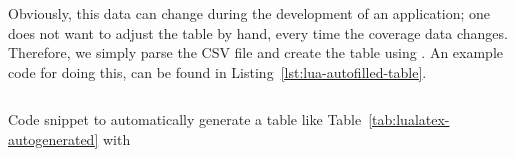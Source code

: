 Obviously, this data can change during the development of an application; one
does not want to adjust the table by hand, every time the coverage data changes.
Therefore, we simply parse the CSV file and create the table using
.  An example code for doing this, can be found in
Listing~\ref{lst:lua-autofilled-table}.

\begin{listing}[H]
  \inputminted[firstline=22,lastline=54]{latex}{../examples/lua-autofilled-table.tex}
  \caption{Code snippet to automatically generate a table like
    Table~\ref{tab:lualatex-autogenerated} with }
  \label{lst:lua-autofilled-table}
\end{listing}
